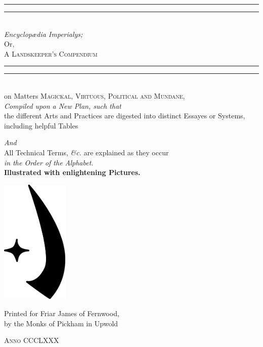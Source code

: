 \documentclass[twoside,11pt,b5paper]{scrbook}
\begin{document}
\begin{titlepage}
 \centering
 \vspace*{\baselineskip}
 \rule{\textwidth}{1.6pt}\vspace*{-\baselineskip}\vspace*{2pt}
 \rule{\textwidth}{0.4pt}\\[\baselineskip]
 
 {\Huge \itshape Encyclopædia Imperialys;}\\[0.4em]
 {\Large Or,\\[0.4em]}
 {\huge\scshape A Landskeeper's Compendium}\\
 \rule{\textwidth}{0.4pt}\vspace*{-\baselineskip}\vspace{3.2pt}
 \rule{\textwidth}{1.6pt}\\[\baselineskip]
 {\Large on Matters \scshape Magickal, Virtuous, Political {\normalfont and} Mundane,\\[0.9em]}
 {\itshape Compiled upon a New Plan, such that\\[0.5em]}
 {\large the different Arts and Practices are digested into distinct Essayes or Systems, including helpful Tables}
 
 {\itshape And\\[0.5em]}
 {\large All Technical Terms, \textit{\&c.} are explained as they occur \\[0.5em] \itshape in the Order of the Alphabet.}
 \\[0.9em]
 {\bfseries Illustrated with enlightening Pictures.}
 
 \vfill
 
 \includegraphics[height=6cm]{encyclopedia/Sular.pdf}

 \vfill

 Printed for Friar James of Fernwood,\\[0.4em]
 by the Monks of Pickham in Upwold
 
 {\scshape Anno CCCLXXX}
\end{titlepage}
\end{document}
